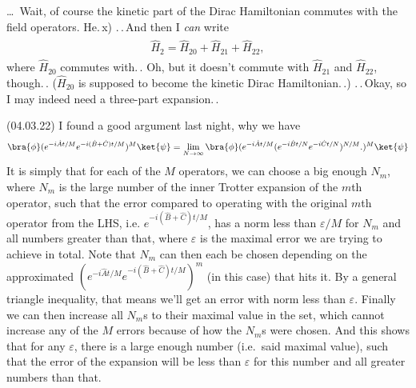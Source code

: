 \documentclass{report}
\begin{document}
\ldots\ Wait, of course the kinetic part of the Dirac Hamiltonian commutes with the field operators. He.\,x) .\,.\,And then I \emph{can} write
\begin{align}
\begin{aligned}
	\hat H_{2} = \hat H_{20} + \hat H_{21} + \hat H_{22},
\end{aligned}
\end{align}
where $\hat H_{20}$ commutes with.\,. Oh, but it doesn't commute with $\hat H_{21}$ and $\hat H_{22}$, though.\,. ($\hat H_{20}$ is supposed to become the kinetic Dirac Hamiltonian.\,.) .\,.\,Okay, so I may indeed need a three-part expansion.\,. 


(04.03.22) I found a good argument last night, why we have
\begin{align}
\begin{aligned}
	\bra{\phi} (e^{-i \hat A t / M } e^{-i (\hat B + \hat C) t / M})^M \ket{\psi}
	=
	\lim_{N \to \infty}
		\bra{\phi} (
			e^{-i \hat A t / M } 
			(e^{-i \hat B t / N} e^{-i \hat C t / N})^{N/M}.
		)^M \ket{\psi} 
\end{aligned}
\end{align}
It is simply that for each of the $M$ operators, we can choose a big enough $N_m$, where $N_m$ is the large number of the inner Trotter expansion of the $m$th operator, such that the error compared to operating with the original $m$th operator from the LHS, i.e. $e^{-i (\hat B + \hat C) t / M}$, has a norm less than $\varepsilon/M$ for $N_m$ and all numbers greater than that, where $\varepsilon$ is the maximal error we are trying to achieve in total. Note that $N_m$ can then each be chosen depending on the approximated $(e^{-i \hat A t / M } e^{-i (\hat B + \hat C) t / M})^m$ (in this case) that hits it. By a general triangle inequality, that means we'll get an error with norm less than $\varepsilon$. Finally we can then increase all $N_m$s to their maximal value in the set, which cannot increase any of the $M$ errors because of how the $N_m$s were chosen. And this shows that for any $\varepsilon$, there is a large enough number (i.e.\ said maximal value), such that the error of the expansion will be less than $\varepsilon$ for this number and all greater numbers than that.
\end{document}
